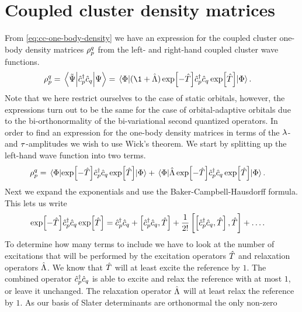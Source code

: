 \chapter{Coupled cluster density matrices}
    \label{app:cc-density-matrices}
    From \autoref{eq:cc-one-body-density} we have an expression for the coupled
    cluster one-body density matrices $\rho^q_p$ from the left- and
    right-hand coupled cluster wave functions.
    \begin{align}
        \densityten^{q}_{p}
        &= \mel{\tilde{\Psi}}{\ccr{p}\can{q}}{\Psi}
        = \mel{\slat}{
            (\1 + \clustl)
            \exp[-\clust]
            \ccr{p}\can{q}
            \exp[\clust]
        }{\slat}.
    \end{align}
    Note that we here restrict ourselves to the case of static orbitals,
    however, the expressions turn out to be the same for the case of
    orbital-adaptive orbitals due to the bi-orthonormality of the bi-variational
    second quantized operators.
    In order to find an expression for the one-body density matrices in terms of
    the $\lambda$- and $\tau$-amplitudes we wish to use Wick's theorem.
    We start by splitting up the left-hand wave function into two terms.
    \begin{align}
        \rho^q_p
        &= \mel{\Phi}{
            \exp[-\hat{T}]
            \hat{c}_{p}^{\dagger}\hat{c}_{q}
            \exp[\hat{T}]
        }{\Phi}
        + \mel{\Phi}{
            \hat{\Lambda}\exp[-\hat{T}]
            \hat{c}_{p}^{\dagger}\hat{c}_{q}
            \exp[\hat{T}]
        }{\Phi}.
    \end{align}
    Next we expand the exponentials and use the Baker-Campbell-Hausdorff
    formula.
    This lets us write
    \begin{align}
        \exp[-\hat{T}]
        \hat{c}_{p}^{\dagger}\hat{c}_{q}
        \exp[\hat{T}]
        &= \hat{c}_{p}^{\dagger}\hat{c}_{q}
        + \left[\hat{c}_{p}^{\dagger}\hat{c}_{q}, \hat{T}\right]
        + \frac{1}{2!}\left[\left[\hat{c}_{p}^{\dagger}\hat{c}_{q}, \hat{T}\right], \hat{T}\right]
        + \dots.
    \end{align}
    To determine how many terms to include we have to look at the number of
    excitations that will be performed by the excitation operators $\hat{T}$ and
    relaxation operators $\hat{\Lambda}$.
    We know that $\hat{T}$ will at least excite the reference by $1$.
    The combined operator $\hat{c}_{p}^{\dagger}\hat{c}_{q}$ is able to excite and relax the
    reference with at most $1$, or leave it unchanged.
    The relaxation operator $\hat{\Lambda}$ will at least relax the reference by $1$.
    As our basis of Slater determinants are orthonormal the only non-zero
